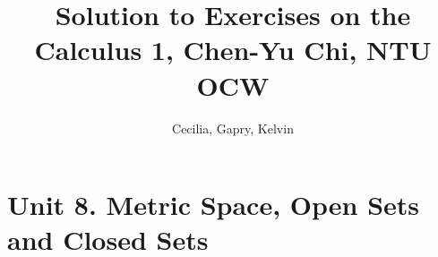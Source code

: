 \documentclass{article}
\title{Solution to Exercises on the \\
Calculus 1, Chen-Yu Chi, NTU OCW}
\author{Cecilia, Gapry, Kelvin}
\begin{document}
\maketitle

\section*{Unit 8. Metric Space, Open Sets and Closed Sets}

\end{document}
